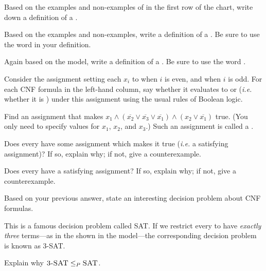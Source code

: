 \documentclass{tufte-handout}
\begin{document}
\begin{questions}
\item Based on the examples and non-examples of  in the first row
  of the chart, write down a definition of a .
\item Based on the examples and non-examples, write a definition of
  a . Be sure to use the word  in your definition.
\item Again based on the model, write a definition of a . Be sure to use the word .
\item Consider the assignment setting each $x_i$ to \True when $i$ is
  even, and \False when $i$ is odd.  For each CNF formula in the
  left-hand column, say whether it evaluates to \True or \False
  (\emph{i.e.}  whether it is ) under this assignment
  using the usual rules of Boolean logic.
\item Find an assignment that makes $x_1 \land (\overline{x_2} \lor
  \overline{x_3} \lor \overline{x_1}) \land (x_2 \lor \overline{x_1})$
  true. (You only need to specify values for $x_1$, $x_2$, and $x_3$.)
  Such an assignment is called a .
\item Does every  have some assignment which makes it
  true (\emph{i.e.} a satisfying assignment)?  If so, explain why; if
  not, give a counterexample.
\item Does every  have a satisfying assignment?  If
  so, explain why; if not, give a counterexample.
\item Based on your previous answer, state an interesting decision
  problem about CNF formulas.
\end{questions}

This is a famous decision problem called \textsc{SAT}.  If we restrict
every  to have \emph{exactly three} terms---as in the
 shown in the model---the corresponding decision
problem is known as \textsc{3-SAT}.

\begin{questions}
\item Explain why $\textsc{3-SAT} \leq_P \textsc{SAT}$.
\end{questions}
\end{document}
